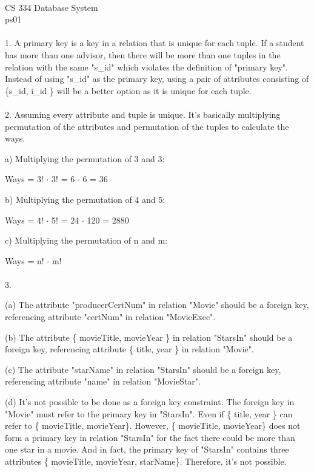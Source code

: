 \documentclass{article}
\begin{document}
~\\
CS 334 Database System ~\\
ps01 ~\\\\
1. A primary key is a key in a relation that is unique for each tuple. If a student has more than one advisor, then there will be more than one tuples in the relation with the same "s\_id" which violates the definition of "primary key". Instead of using "s\_id" as the primary key, using a pair of attributes consisting of \{s\_id, i\_id \} will be a better option as it is unique for each tuple.
~\\\\
2. Assuming every attribute and tuple is unique. It's basically multiplying permutation of the attributes and permutation of the tuples to calculate the ways. \par
a) Multiplying the permutation of 3 and 3:\par
Ways = 3! $\cdot$ 3! = 6 $\cdot$ 6 = 36 \par
b) Multiplying the permutation of 4 and 5:\par
Ways = 4! $\cdot$ 5! = 24 $\cdot$ 120 = 2880 \par
c) Multiplying the permutation of n and m:\par
Ways = n! $\cdot$ m!
~\\\\
3.\par
(a) The attribute "producerCertNum" in relation "Movie" should be a foreign key, referencing attribute "certNum" in relation "MovieExec". \par
(b) The attribute \{ movieTitle, movieYear \} in relation "StarsIn" should be a foreign key, referencing attribute \{ title, year \} in relation "Movie". \par
(c) The attribute "starName" in relation "StarsIn" should be a foreign key, referencing attribute "name" in relation "MovieStar". \par
(d) It's not possible to be done as a foreign key constraint. The foreign key in "Movie" must refer to the primary key in "StarsIn". Even if \{ title, year \} can refer to \{ movieTitle, movieYear\}. However, \{ movieTitle, movieYear\} does not form a primary key in relation "StarsIn" for the fact there could be more than one star in a movie. And in fact, the primary key of "StarsIn" contains three attributes \{ movieTitle, movieYear, starName\}. Therefore, it's not possible.
\end{document}
